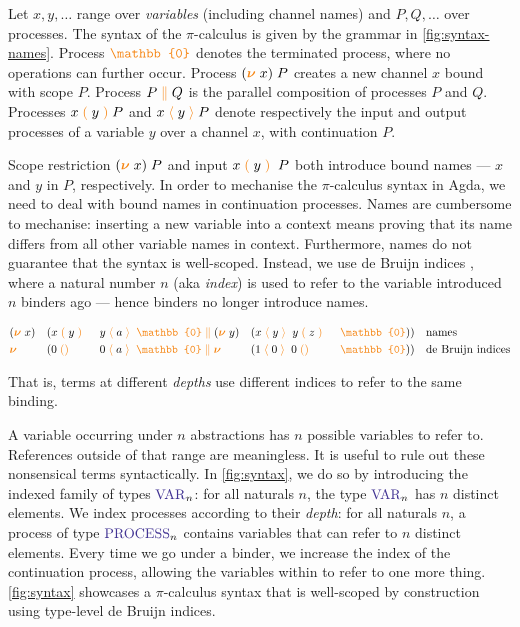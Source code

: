 \documentclass[a4paper,UKenglish,cleveref,autoref,thm-restate,authorcolumns]{lipics-v2019}
\theoremstyle{definition}
\newcommand{\picalc}{$\pi$-calculus}
\newcommand{\type}[1]{\textcolor{BlueViolet}{\operatorname{#1}}}
\newcommand{\constr}[1]{\textcolor{BurntOrange}{\operatorname{#1}}}
\newcommand{\PO}{\constr{\mathbb{0}}}
\newcommand{\comp}[2]{#1 \; \constr{\parallel} \; #2}
\newcommand{\new}{\constr{\boldsymbol{\nu}} \;}
\newcommand{\send}[2]{#1 \; \constr{\langle} \; #2 \;\constr{\rangle} \;}
\newcommand{\sendp}[2]{#1 \; \constr{\langle} \; #2 \; \constr{\rangle} \;}
\newcommand{\recv}[1]{#1 \; \constr{\mathbb{()}} \;}
\newcommand{\recvp}[2]{#1 \; \constr{(} \; #2 \; \constr{)} \;}
\newcommand{\Var}{\type{VAR}}
\newcommand{\Process}{\type{PROCESS}}
\begin{document}
Let $x, y,\ldots$ range over \emph{variables} (including channel names) and $P, Q,\ldots$ over processes.
The syntax of the \picalc{} \cite{Sangio01} is given by the grammar in \autoref{fig:syntax-names}.
Process $\PO$ denotes the terminated process, where no operations can further occur.
Process $(\new{}x)\; P$ creates a new channel $x$ bound with scope $P$.
Process $\comp{P}{Q}$ is the parallel composition of processes $P$ and $Q$.
Processes $\recvp{x}{y} P$ and $\sendp{x}{y} P$ denote respectively the input and output processes of a variable $y$ over a channel $x$, with continuation $P$.

Scope restriction $(\new{}x) \; P$ and input $\recvp{x}{y} \; P$ both introduce bound names --- $x$ and $y$ in $P$, respectively.
In order to mechanise the \picalc{} syntax in Agda, we need to deal with bound names in continuation processes.
Names are cumbersome to mechanise: inserting a new variable into a context means proving that its name differs from all other variable names in context.
Furthermore, names do not guarantee that the syntax is well-scoped.
Instead, we use de Bruijn indices \cite{deBruijn1972}, where a natural number $n$ (aka \emph{index}) is used to refer to the variable introduced $n$ binders ago --- hence binders no longer introduce names.
\begin{example}
  \begin{equation*}
    \begin{split}
      & (\new{}x ) && (\comp {\recvp{x}{y} && \; \sendp{y}{a} \; \PO} {(\new{} y) && (\sendp{x}{y} \; \recvp{y}{z} && \; \PO)})
      && \text{names}
      \\
      & \new{} && (\comp {\recv{0} && \; \send{0}{a} \; \PO} {\new{} && (\send{1}{0} \; \recv{0} && \; \PO)})
      && \text{de Bruijn indices}
      \\
    \end{split}
  \end{equation*}
\end{example}
That is, terms at different \emph{depths} use different indices to refer to the same binding.

A variable occurring under $n$ abstractions has $n$ possible variables to refer to.
References outside of that range are meaningless.
It is useful to rule out these nonsensical terms syntactically.
In \autoref{fig:syntax}, we do so by introducing the indexed family of types $\Var_n$: for all naturals $n$, the type $\Var_n$ has $n$ distinct elements.
We index processes according to their \emph{depth}: for all naturals $n$, a process of type $\Process_n$ contains variables that can refer to $n$ distinct elements.
Every time we go under a binder, we increase the index of the continuation process, allowing the variables within to refer to one more thing.
\autoref{fig:syntax} showcases a \picalc{} syntax that is well-scoped by construction using type-level de Bruijn indices.
\end{document}
